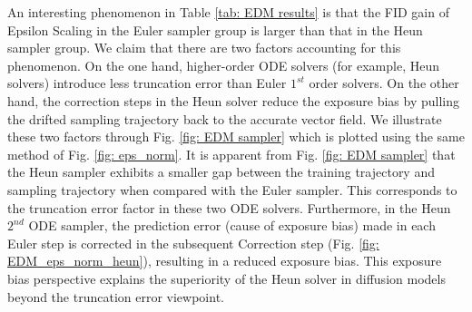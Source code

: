 \documentclass{article} \usepackage{iclr2024_conference,times}
\begin{document}
An interesting phenomenon in Table \ref{tab: EDM results} is that the FID gain of Epsilon Scaling in the Euler sampler group is larger than that in the Heun sampler group. We claim that there are two factors accounting for this phenomenon. On the one hand, higher-order ODE solvers (for example, Heun solvers) introduce less truncation error than Euler $1^{st}$ order solvers. On the other hand, the correction steps in the Heun solver reduce the exposure bias by pulling the drifted sampling trajectory back to the accurate vector field. We illustrate these two factors through Fig. \ref{fig: EDM sampler} which is plotted using the same method of Fig. \ref{fig: eps_norm}. It is apparent from Fig. \ref{fig: EDM sampler} that the Heun sampler exhibits a smaller gap between the training trajectory and sampling trajectory when compared with the Euler sampler. This corresponds to the truncation error factor in these two ODE solvers. Furthermore, in the Heun $2^{nd}$ ODE sampler, the prediction error (cause of exposure bias) made in each Euler step is corrected in the subsequent Correction step (Fig. \ref{fig: EDM_eps_norm_heun}), resulting in a reduced exposure bias.
This exposure bias perspective explains the superiority of the Heun solver in diffusion models beyond the truncation error viewpoint.

\begin{figure*}[tbh]
\vskip -0.1in
\centering
\captionsetup{skip=2pt}
\caption{$\left\| \pmb{\epsilon_{\theta}}(\cdot) \right\|_2$ during training and sampling on CIFAR-10.  We use 21-step sampling and report the L2-norm using 50k samples at each timestep. The sampling is from right to left in the figures.} 
\label{fig: EDM sampler}
\vskip -0.1in
\end{figure*}
\end{document}
